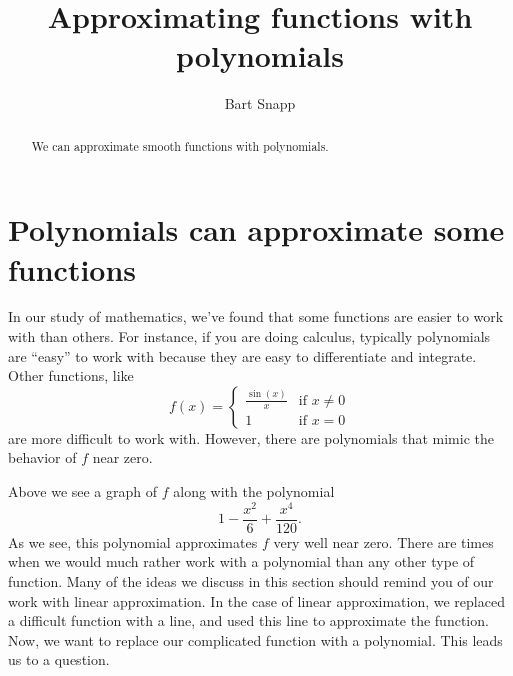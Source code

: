 \documentclass{ximera}
\author{Bart Snapp}
\title[Dig-In:]{Approximating functions with polynomials}
\begin{document}
\begin{abstract}
We can approximate smooth functions with polynomials.
\end{abstract}
\maketitle


\section{Polynomials can approximate some functions}

In our study of mathematics, we've found that some functions are
easier to work with than others. For instance, if you are doing
calculus, typically polynomials are ``easy'' to work with because they
are easy to differentiate and integrate. Other functions, like
\[
f(x) =
\begin{cases}
  \frac{\sin(x)}{x} &\text{if $x\ne 0$}\\
  1 &\text{if $x=0$}
\end{cases}
\]
are more difficult to work with. However, there are
polynomials that mimic the behavior of $f$ near zero.
\begin{image}
\end{image}
Above we see a graph of $f$ along with the polynomial
\[
1-\frac{x^2}{6}+\frac{x^4}{120}.
\]
As we see, this polynomial approximates $f$ very well near zero.  There are times 
when we would much rather work with a polynomial than any other type of function. 
Many of the ideas we discuss in this section should remind you of our work with 
linear approximation.  In the case of linear approximation, we replaced a difficult 
function with a line, and used this line to approximate the function.  Now, we want to 
replace our complicated function with a polynomial. This leads us to a question.
\end{document}
